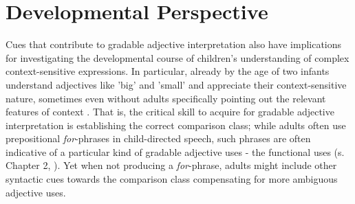 \section{Developmental Perspective}
Cues that contribute to gradable adjective interpretation also have implications for investigating the developmental course of children's understanding of complex context-sensitive expressions. In particular, already by the age of two infants understand adjectives like 'big' and 'small' and appreciate their context-sensitive nature, sometimes even without adults specifically pointing out the relevant features of context \parencite{Mintz2002, ebeling1994children}. That is, the critical skill to acquire for gradable adjective interpretation is establishing the correct comparison class; while adults often use prepositional \emph{for}-phrases in child-directed speech, such phrases are often indicative of a particular kind of gradable adjective uses - the functional uses (s. Chapter 2, \textcite{ebeling1994children}). Yet when not producing a \emph{for}-phrase, adults might include other syntactic cues towards the comparison class compensating for more ambiguous adjective uses. 

